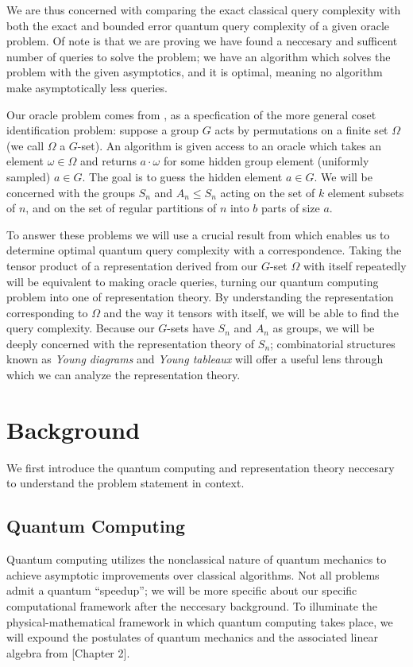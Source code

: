 \documentclass[12pt,twoside]{reedthesis}
\theoremstyle{plain}   %
\theoremstyle{definition}
\theoremstyle{remark}
\numberwithin{equation}{section}
\begin{document}
  We are thus concerned with comparing the exact classical query complexity with both the exact and bounded error quantum query complexity of a given oracle problem.
  Of note is that we are proving we have found a neccesary and sufficent number of queries to solve the problem; we have an algorithm which solves the problem with the given asymptotics, and it is optimal,
  meaning no algorithm make asymptotically less queries.
  \par
  Our oracle problem comes from \cite{copeland}, as a specfication of the more general coset identification problem:
  suppose a group $G$ acts by permutations on a finite set $\Omega$ (we call $\Omega$ a $G$-set).
  An algorithm is given access to an oracle which takes an element $\omega \in \Omega$ and returns $a \cdot \omega$ for some hidden group element (uniformly sampled) $a \in G$. The goal is to guess
  the hidden element $a \in G$.
  We will be concerned with the groups $S_n$ and $A_n \leq S_n$ acting on the set of $k$ element subsets of $n$, and on the set of regular partitions of $n$ into $b$ parts of size $a$.
  \par
  To answer these problems we will use a crucial result from \cite{copeland} which enables us to determine optimal quantum query complexity with a correspondence.
  Taking the tensor product of a representation derived from our $G$-set $\Omega$ with itself repeatedly will be equivalent to making oracle queries, turning our quantum computing problem
  into one of representation theory.
  By understanding the representation corresponding to $\Omega$ and the way it tensors with itself, we will be able to find the query complexity.
  Because our $G$-sets have $S_n$ and $A_n$ as groups, we will be deeply concerned with the representation theory of $S_n$;
  combinatorial structures known as \emph{Young diagrams} and \emph{Young tableaux} will offer a useful lens through which we can analyze the representation theory.
  
  
  \chapter{Background}
  We first introduce the quantum computing and representation theory neccesary to understand the problem statement in context.
  \section{Quantum Computing}
  Quantum computing utilizes the nonclassical nature of quantum mechanics to achieve asymptotic improvements over classical algorithms.
  Not all problems admit a quantum ``speedup''; we will be more specific about our specific computational framework after the neccesary background.
  To illuminate the physical-mathematical framework in which quantum computing takes place, we will expound the postulates of quantum mechanics and the associated linear algebra from \cite{nielsen2010}[Chapter 2].
\end{document}
